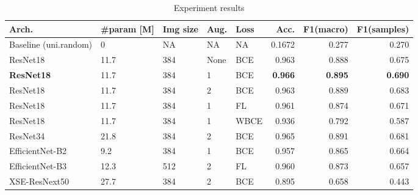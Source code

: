 \documentclass[conference]{IEEEtran}
\begin{document}
\begin{table}[bp]
\caption{Experiment results}
\begin{center}
\begin{tabular}{lllll|rrr}
\textbf{Arch.} & \textbf{\#param [M]} & \multicolumn{1}{l}{\textbf{Img size}} & \textbf{Aug.} & \textbf{Loss} & \multicolumn{1}{r}{\textbf{Acc.}} & \multicolumn{1}{r}{\textbf{F1(macro)}} & \multicolumn{1}{r}{\textbf{F1(samples)}} \\ \hline
Baseline (uni.random) & 0        & NA & NA                    & NA     & 0.1672                                & 0.277                                  & 0.270                                   \\ 
ResNet18              & 11.7     & 384 & None                 & BCE    & 0.963                                 & 0.888                                  & 0.675                                   \\ 
\textbf{ResNet18}     & 11.7     & 384 & 1                    & BCE    & \textbf{0.966}                        & \textbf{0.895}                         & \textbf{0.690}                                   \\ 
ResNet18              & 11.7     & 384 & 2                    & BCE    & 0.963                                 & 0.889                                  & 0.683                                   \\ 
ResNet18              & 11.7     & 384 & 1                    & FL     & 0.961                                 & 0.874                                  & 0.671                                   \\ 
ResNet18              & 11.7     & 384 & 1                    & WBCE   & 0.936                                 & 0.792                                  & 0.587                                   \\ 
ResNet34              & 21.8     & 384 & 2                    & BCE    & 0.965                                 & 0.891                                  & 0.681                                   \\ 
EfficientNet-B2       & 9.2      & 384 & 1                    & BCE    & 0.957                                 & 0.865                                  & 0.664                                   \\ 
EfficientNet-B3       & 12.3     & 512 & 2                    & FL     & 0.960                                 & 0.873                                  & 0.657                                   \\ 
XSE-ResNext50         & 27.7     & 384 & 2                    & BCE    & 0.895                                 & 0.658                                  & 0.443                                   \\
\end{tabular}
\label{table:experiment_results}
\end{center}
\end{table}
\end{document}
